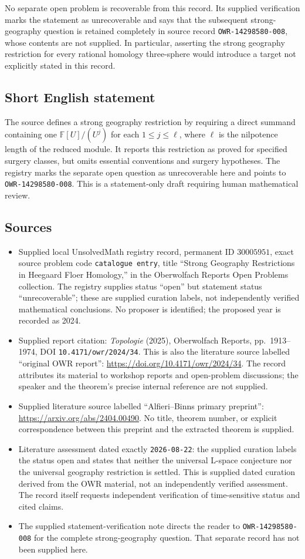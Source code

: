 \documentclass[11pt]{article}
\newcommand{\F}{\mathbb{F}}
\begin{document}
No separate open problem is recoverable from this record. Its supplied verification marks the statement as unrecoverable and says that the subsequent strong-geography question is retained completely in source record \texttt{OWR-14298580-008}, whose contents are not supplied. In particular, asserting the strong geography restriction for every rational homology three-sphere would introduce a target not explicitly stated in this record.
\subsection{Short English statement}
The source defines a strong geography restriction by requiring a direct summand containing one \(\F[U]/(U^j)\) for each \(1\leq j\leq\ell\), where \(\ell\) is the nilpotence length of the reduced module. It reports this restriction as proved for specified surgery classes, but omits essential conventions and surgery hypotheses. The registry marks the separate open question as unrecoverable here and points to \texttt{OWR-14298580-008}. This is a statement-only draft requiring human mathematical review.
\subsection{Sources}
\begin{itemize}
\item Supplied local UnsolvedMath registry record, permanent ID \(30005951\), exact source problem code \texttt{catalogue entry}, title ``Strong Geography Restrictions in Heegaard Floer Homology,'' in the Oberwolfach Reports Open Problems collection. The registry supplies status ``open'' but statement status ``unrecoverable''; these are supplied curation labels, not independently verified mathematical conclusions. No proposer is identified; the proposed year is recorded as 2024.
\item Supplied report citation: \emph{Topologie} (2025), Oberwolfach Reports, pp.~1913--1974, DOI \texttt{10.4171/owr/2024/34}. This is also the literature source labelled ``original OWR report'': \url{https://doi.org/10.4171/owr/2024/34}. The record attributes its material to workshop reports and open-problem discussions; the speaker and the theorem's precise internal reference are not supplied.
\item Supplied literature source labelled ``Alfieri--Binns primary preprint'': \url{https://arxiv.org/abs/2404.00490}. No title, theorem number, or explicit correspondence between this preprint and the extracted theorem is supplied.
\item Literature assessment dated exactly \texttt{2026-08-22}: the supplied curation labels the status open and states that neither the universal L-space conjecture nor the universal geography restriction is settled. This is supplied dated curation derived from the OWR material, not an independently verified assessment. The record itself requests independent verification of time-sensitive status and cited claims.
\item The supplied statement-verification note directs the reader to \texttt{OWR-14298580-008} for the complete strong-geography question. That separate record has not been supplied here.
\end{itemize}
\end{document}
